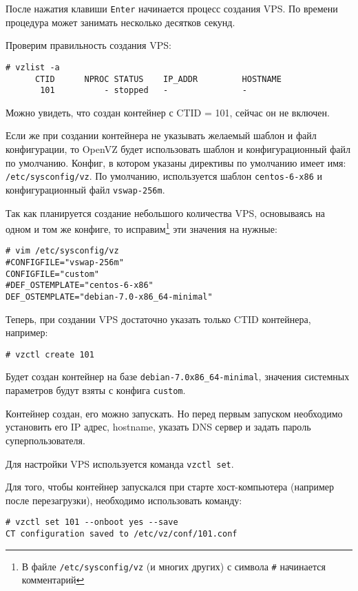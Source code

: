 После нажатия клавиши \texttt{Enter} начинается процесс создания VPS. 
По времени процедура может занимать несколько десятков секунд.

Проверим правильность создания VPS:
\begin{lstlisting}
# vzlist -a
      CTID      NPROC STATUS    IP_ADDR         HOSTNAME
       101          - stopped   -               -
\end{lstlisting}

Можно увидеть, что создан контейнер с CTID = 101, сейчас он не включен.

Если же при создании контейнера не указывать желаемый шаблон и файл конфигурации, то OpenVZ будет использовать шаблон и конфигурационный файл по умолчанию.
Конфиг, в котором указаны директивы по умолчанию имеет имя: \texttt{/etc/sysconfig/vz}.
По умолчанию, используется шаблон \texttt{centos-6-x86} и конфигурационный файл \texttt{vswap-256m}.

Так как планируется создание небольшого количества VPS, основываясь на одном и том же конфиге, то исправим\footnote{В файле \texttt{/etc/sysconfig/vz} (и многих других) с символа \texttt{\#} начинается комментарий} эти значения на нужные:
\begin{lstlisting}
# vim /etc/sysconfig/vz
#CONFIGFILE="vswap-256m"
CONFIGFILE="custom"
#DEF_OSTEMPLATE="centos-6-x86"
DEF_OSTEMPLATE="debian-7.0-x86_64-minimal"
\end{lstlisting}

Теперь, при создании VPS достаточно указать только CTID контейнера, например:
\begin{lstlisting}
# vzctl create 101
\end{lstlisting}

Будет создан контейнер на базе \texttt{debian-7.0x86\_64-minimal}, значения системных параметров будут взяты с конфига \texttt{custom}.

Контейнер создан, его можно запускать.
Но перед первым запуском необходимо установить его IP адрес, hostname, указать DNS сервер и задать пароль суперпользователя.

Для настройки VPS используется команда \texttt{vzctl set}.

Для того, чтобы контейнер запускался при старте хост-компьютера (например после перезагрузки), необходимо использовать команду:
\begin{lstlisting}
# vzctl set 101 --onboot yes --save
CT configuration saved to /etc/vz/conf/101.conf
\end{lstlisting}

